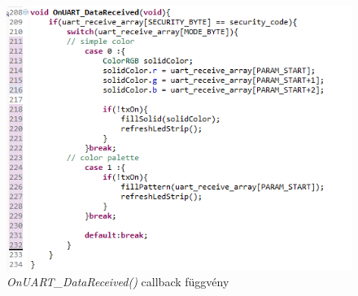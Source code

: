 \documentclass[../main.tex]{subfiles}
\begin{document}
        \begin{figure}[h!]
            \centering
                \includegraphics[width=13cm]{mbed_res/callback_function}
            \caption{\textit{OnUART_DataReceived()} callback függvény}
            \label{fig:callback_function}
        \end{figure}

\newpage            
\end{document}
